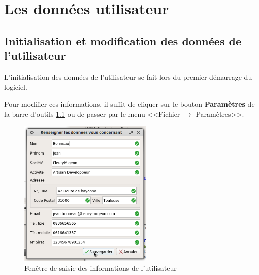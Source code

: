 \chapter{Les données utilisateur}
\section{Initialisation et modification des données de l'utilisateur}
L'initialisation des données de l'utilisateur se fait lors du premier démarrage du logiciel.

Pour modifier ces informations, il suffit de cliquer sur le bouton \textbf{Paramètres} de la barre d'outils \ref{fig:modifierUtilisateur} ou de passer par le menu <<Fichier $\rightarrow$ Paramètres>>. 

\begin{figure}[H]
	\centering
	\includegraphics[height=7cm]{screens/modifierUtilisateur.png}
	\caption{Fenêtre de saisie des informations de l'utilisateur}
	\label{fig:modifierUtilisateur}
\end{figure}